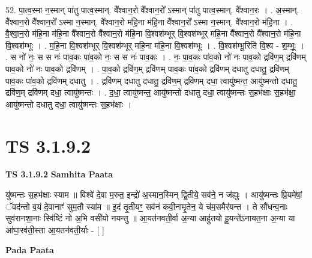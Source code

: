 \documentclass[17pt]{extarticle}
\begin{document}
52. पा॒त्व॒स्मा न॒स्मान् पा॑तु पात्व॒स्मान्. वै᳚श्वान॒रो वै᳚श्वान॒रो᳚ ऽस्मान् पा॑तु पात्व॒स्मान्. वै᳚श्वान॒रः । . अ॒स्मान्. वै᳚श्वान॒रो वै᳚श्वान॒रो᳚ ऽस्मा न॒स्मान्. वै᳚श्वान॒रो म॑हि॒ना म॑हि॒ना वै᳚श्वान॒रो᳚ ऽस्मा न॒स्मान्. वै᳚श्वान॒रो म॑हि॒ना । . वै॒श्वा॒न॒रो म॑हि॒ना म॑हि॒ना वै᳚श्वान॒रो वै᳚श्वान॒रो म॑हि॒ना वि॒श्वश॑म्भूर् वि॒श्वश॑म्भूर् महि॒ना वै᳚श्वान॒रो वै᳚श्वान॒रो म॑हि॒ना वि॒श्वश॑म्भूः । . म॒हि॒ना वि॒श्वश॑म्भूर् वि॒श्वश॑म्भूर् महि॒ना म॑हि॒ना वि॒श्वश॑म्भूः । . वि॒श्वश॑म्भू॒रिति॑ वि॒श्व - श॒म्भूः॒ । . स नो॑ नः॒ स स नः॑ पाव॒कः पा॑व॒को नः॒ स स नः॑ पाव॒कः । . नः॒ पा॒व॒कः पा॑व॒को नो॑ नः पाव॒को द्रवि॑ण॒म् द्रवि॑णम् पाव॒को नो॑ नः पाव॒को द्रवि॑णम् । . पा॒व॒को द्रवि॑ण॒म् द्रवि॑णम् पाव॒कः पा॑व॒को द्रवि॑णम् दधातु दधातु॒ द्रवि॑णम् पाव॒कः पा॑व॒को द्रवि॑णम् दधातु । . द्रवि॑णम् दधातु दधातु॒ द्रवि॑ण॒म् द्रवि॑णम् दधा॒ त्वायु॑ष्मन्त॒ आयु॑ष्मन्तो दधातु॒ द्रवि॑ण॒म् द्रवि॑णम् दधा॒ त्वायु॑ष्मन्तः । . द॒धा॒ त्वायु॑ष्मन्त॒ आयु॑ष्मन्तो दधातु दधा॒ त्वायु॑ष्मन्तः स॒हभ॑क्षाः स॒हभ॑क्षा॒ आयु॑ष्मन्तो दधातु दधा॒ त्वायु॑ष्मन्तः स॒हभ॑क्षाः । \newline
\pagebreak
{}

\section{ TS 3.1.9.2 }

\textbf{TS 3.1.9.2 } \newline
\textbf{Samhita Paata} \newline

यु॑ष्मन्तः स॒हभ॑क्षाः स्याम ॥ विश्वे॑ दे॒वा म॒रुत॒ इन्द्रो॑ अ॒स्मान॒स्मिन् द्वि॒तीये॒ सव॑ने॒ न ज॑ह्युः । आयु॑ष्मन्तः प्रि॒यमे॑षां॒ ॅवद॑न्तो व॒यं दे॒वानाꣳ॑ सुम॒तौ स्या॑म ॥ इ॒दं तृ॒तीयꣳ॒॒ सव॑नं कवी॒नामृ॒तेन॒ ये च॑म॒समैर॑यन्त । ते सौ॑धन्व॒नाः सुव॑रानशा॒नाः स्वि॑ष्टिं नो अ॒भि वसी॑यो नयन्तु ॥ आ॒यत॑नवती॒र्वा अ॒न्या आहु॑तयो हू॒यन्ते॑ऽनायत॒ना अ॒न्या या आ॑घा॒रव॑ती॒स्ता आ॒यतन॑वती॒र्याः - [  ] \newline

\textbf{Pada Paata} \newline
\end{document}
